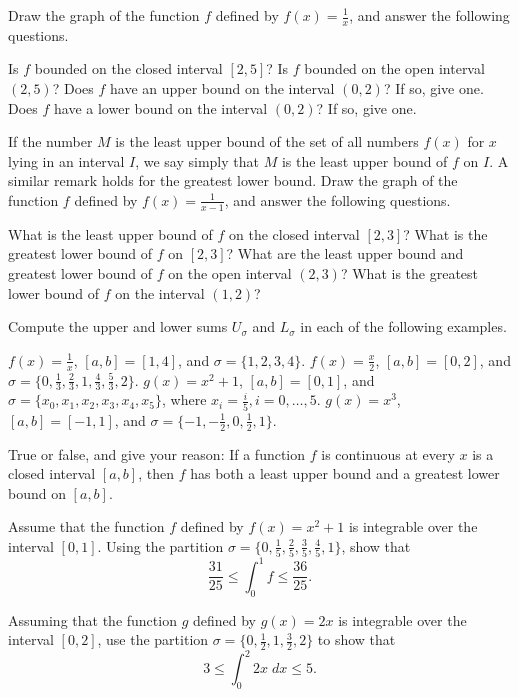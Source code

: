 \begin{exercises}

Draw the graph of the function $f$ defined by
$f(x) = \frac1x$,
and answer the following questions.
\begin{exenum}
\x
Is $f$ bounded on the closed interval $[2,5]$?
\x
Is $f$ bounded on the open interval $(2,5)$?
\x
Does $f$ have an upper bound on the interval $(0,2)$?
If so, give one.
\x
Does $f$ have a lower bound on the interval $(0,2)$?
If so, give one.
\end{exenum}

If the number $M$ is the least upper bound of the set
of all numbers $f(x)$ for $x$ lying in an interval $I$,
we say simply that $M$ is the least upper bound
of $f$ on $I$.
A similar remark holds for the greatest lower bound.
Draw the graph of the function $f$ defined by
$f(x) = \frac1{x-1}$, and answer the following questions.
\begin{exenum}
\x
What is the least upper bound of $f$ on the closed interval
$[2,3]$?
\x
What is the greatest lower bound of $f$ on $[2,3]$?
\x
What are the least upper bound and greatest lower bound
of $f$ on the open interval $(2,3)$?
\x
What is the greatest lower bound of $f$ on the interval
$(1,2)$?
\end{exenum}

Compute the upper and lower sums $U_\sigma$ and $L_\sigma$
in each of the following examples.
\begin{exenum}
\x
$f(x) = \frac1x$, $[a,b] = [1,4]$, and
$\sigma = \{1,2,3,4\}$.
\x
$f(x) = \frac x2$, $[a,b] = [0,2]$, and
$\sigma = \{0, \frac13, \frac23, 1, \frac43, \frac53, 2\}$.
\x
$g(x) = x^2 + 1$, $[a,b] = [0,1]$, and
$\sigma = \{x_0,x_1,x_2,x_3,x_4,x_5\}$,
where $x_i = \frac i5, i = 0, \ldots, 5$.
\x
$g(x) = x^3$, $[a,b] = [-1,1]$, and
$\sigma = \{-1, -\frac12, 0, \frac12, 1\}$.
\end{exenum}

True or false, and give your reason:
If a function $f$ is continuous at every $x$ is a
closed interval $[a,b]$, then $f$ has both a least upper
bound and a greatest lower bound on $[a,b]$.

Assume that the function $f$ defined by
$f(x) = x^2 + 1$ is integrable over the interval $[0,1]$.
Using the partition
$\sigma = \{0, \frac15, \frac25, \frac35, \frac45, 1\}$,
show that
\[
\frac{31}{25} \leq \int_0^1 f \leq \frac{36}{25}
.
\]

Assuming that the function $g$ defined by $g(x) = 2x$
is integrable over the interval $[0,2]$, use the partition
$\sigma = \{0, \frac12, 1, \frac32, 2\}$ to show that
\[
3 \leq \int_0^2 2x\;dx \leq 5
.
\]


\end{exercises}
